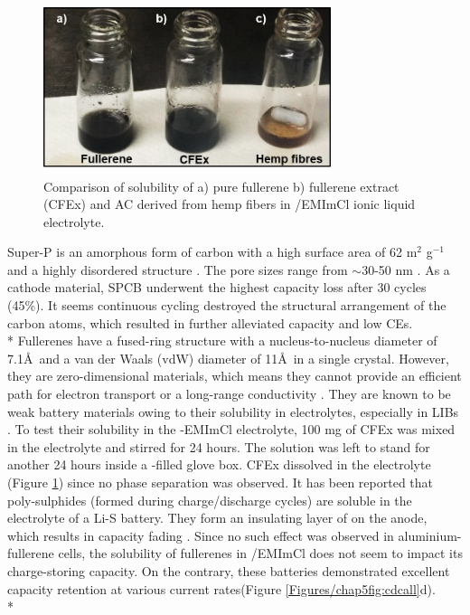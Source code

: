 \begin{figure}[h]
\centering
\includegraphics[width=0.75\textwidth]{Figures/chap5fig/cfexsol}
\caption{Comparison of solubility of a) pure  fullerene b) fullerene extract (CFEx) and AC derived from hemp fibers in /EMImCl ionic liquid electrolyte.}
\label{Figures/chap5fig:cfexsol}
\end{figure}

Super-P is an amorphous form of carbon with a high surface area of 62 m$^2$ g$^{-1}$ and a highly disordered structure \cite{see_reversible_2017}. The pore sizes range from $\sim$30-50 nm \cite{younesi_analysis_2015}. As a cathode material, SPCB underwent the highest capacity loss after 30 cycles (45\%). It seems continuous cycling destroyed the structural arrangement of the carbon atoms, which resulted in further alleviated capacity and low CEs.\\*
Fullerenes have a fused-ring structure with a nucleus-to-nucleus diameter of 7.1\AA\ and a van der Waals (vdW) diameter of 11\AA\ in a single crystal. However, they are zero-dimensional materials, which means they cannot provide an efficient path for electron transport or a long-range conductivity \cite{winkler_two-component_2007}. They are known to be weak battery materials owing to their solubility in electrolytes, especially in LIBs \cite{seger_prospects_1991}. To test their solubility in the -EMImCl electrolyte, 100 mg of CFEx was mixed in the electrolyte and stirred for 24 hours. The solution was left to stand for another 24 hours inside a -filled glove box. CFEx dissolved in the electrolyte (Figure \ref{Figures/chap5fig:cfexsol}) since no phase separation was observed. It has been reported that poly-sulphides (formed during charge/discharge cycles) are soluble in the electrolyte of a Li-S battery. They form an insulating layer of  on the anode, which results in capacity fading \cite{sun_effect_2017}. Since no such effect was observed in aluminium-fullerene cells, the solubility of fullerenes in /EMImCl does not seem to impact its charge-storing capacity. On the contrary, these batteries demonstrated excellent capacity retention at various current rates(Figure \ref{Figures/chap5fig:cdcall}d).\\*

